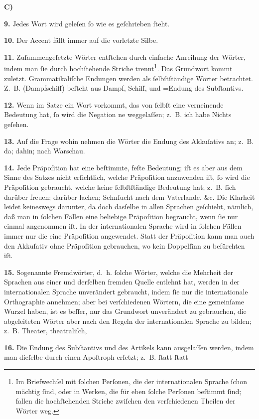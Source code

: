\begin{center}
\Large \bf C) 
\end{center}

{\fr \large
    \textbf{9.} Jedes Wort wird geleſen ſo wie es geſchrieben ſteht.
    
    \textbf{10.} Der Accent fällt immer auf die vorletzte Silbe.
    
    \textbf{11.} Zuſammengeſetzte Wörter entſtehen durch einfache Anreihung der Wörter, indem man ſie durch hochſtehende Striche trennt\footnote{\fr \small Im Briefwechſel mit ſolchen Perſonen, die der internationalen Sprache ſchon mächtig ſind, oder in Werken, die für eben ſolche Perſonen beſtimmt ſind; fallen die hochſtehenden Striche zwiſchen den verſchiedenen Theilen der Wörter weg.}. Das Grundwort kommt zuletzt. Grammatikaliſche Endungen werden als ſelbſtſtändige Wörter betrachtet. Z.~B.  (Dampfschiff) beſteht aus  Dampf,  Schiff, und =Endung des Subſtantivs.

    \textbf{12.} Wenn im Satze ein Wort vorkommt, das von ſelbſt eine verneinende Bedeutung hat, ſo wird die Negation ne weggelaſſen; z.~B.  ich habe Nichts geſehen.
    
    \textbf{13.} Auf die Frage \glqq{}wohin\grqq{} nehmen die Wörter die Endung des Akkuſativs an; z.~B.  da;  dahin;  nach Warschau.
    
    \textbf{14.} Jede Präpoſition hat eine beſtimmte, feſte Bedeutung; iſt es aber aus dem Sinne des Satzes nicht erſichtlich, welche Präpoſition anzuwenden iſt, ſo wird die Präpoſition  gebraucht, welche keine ſelbſtſtändige Bedeutung hat; z.~B.  ſich darüber freuen;  darüber lachen;  Sehnſucht nach dem Vaterlande, \&c. Die Klarheit leidet keineswegs darunter, da doch dasſelbe in allen Sprachen geſchieht, nämlich, daß man in ſolchen Fällen eine beliebige Präpoſition begraucht, wenn ſie nur einmal angenommen iſt. In der internationalen Sprache wird in ſolchen Fällen immer nur die eine Präpoſition  angewendet. Statt der Präpoſition  kann man auch den Akkuſativ ohne Präpoſition gebrauchen, wo kein Doppelſinn zu befürchten iſt.
    
    \textbf{15.} Sogenannte Fremdwörter, d.~h. ſolche Wörter, welche die Mehrheit der Sprachen aus einer und derſelben fremden Quelle entlehnt hat, werden in der internationalen Sprache unverändert gebraucht, indem ſie nur die internationale Orthographie annehmen; aber bei verſchiedenen Wörtern, die eine gemeinſame Wurzel haben, ist es beſſer, nur das Grundwort unverändert zu gebrauchen, die abgeleiteten Wörter aber  nach den Regeln der internationalen Sprache zu bilden; z.~B. Theater,  theatraliſch, 
    
    \textbf{16.} Die Endung des Subſtantivs und des Artikels kann ausgelaſſen werden, indem man dieſelbe durch einen Apoſtroph erſetzt; z.~B.  ſtatt   ſtatt  
}
\newpage
